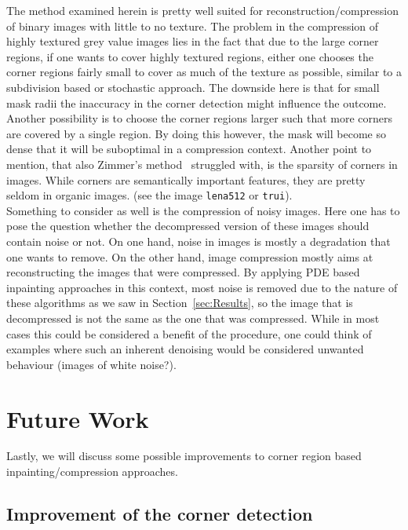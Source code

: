 The method examined herein is pretty well suited for reconstruction/compression of binary images
with little to no texture. The problem in the compression of highly textured grey value images lies in the 
fact that due to the large corner regions, if one wants to cover highly textured regions, either
one chooses the corner regions fairly small to cover as much of the texture as possible, similar to
a subdivision based or stochastic approach. The downside here is that for small mask radii the
inaccuracy in the corner detection might influence the outcome. Another possibility is to choose
the corner regions larger such that more corners are covered by a single region. By doing this
however, the mask will become so dense that it will be suboptimal in a compression context.
Another point to mention, that also Zimmer's method~\cite{zimmer07} struggled with, is the sparsity
of corners in images. While corners are semantically important features, they are pretty seldom in
organic images. (see the image \texttt{lena512} or \texttt{trui}).\\
Something to consider as well is the compression of noisy images. Here one has to pose the question
whether the decompressed version of these images should contain noise or not. On one hand, noise in
images is mostly a degradation that one wants to remove. On the other hand, image compression
mostly aims at reconstructing the images that were compressed. By applying PDE based inpainting
approaches in this context, most noise is removed due to the nature of these algorithms as we saw
in Section~\ref{sec:Results}, so the image that is decompressed is not the same as the one that was
compressed. While in most cases this could be considered a benefit of the procedure, one could
think of examples where such an inherent denoising would be considered unwanted behaviour (images
of white noise?).\\

\section{Future Work}\label{sec:FutureWork}

Lastly, we will discuss some possible improvements to corner region based inpainting/compression
approaches.

\subsection*{Improvement of the corner detection}

